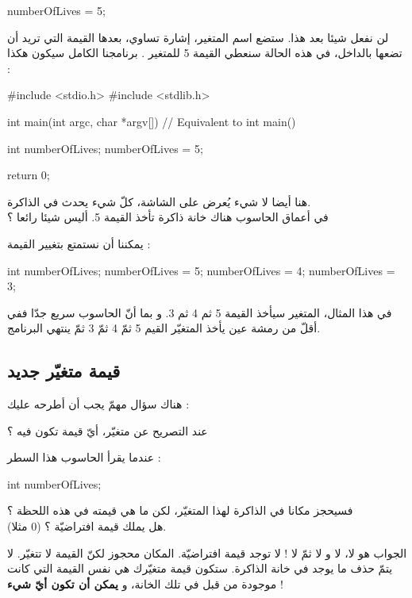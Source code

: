 \begin{Csource}
numberOfLives = 5;
\end{Csource}

لن نفعل شيئا بعد هذا. ستضع اسم المتغير، إشارة تساوي، بعدها القيمة التي تريد أن تضعها بالداخل، في هذه الحالة سنعطي القيمة 5 للمتغير
.
برنامجنا الكامل سيكون هكذا :

\begin{Csource}
#include <stdio.h>
#include <stdlib.h>

int main(int argc, char *argv[]) // Equivalent to int main()
{
  int numberOfLives;
  numberOfLives = 5;

  return 0;
}
\end{Csource}

هنا أيضا لا شيء يُعرض على الشاشة، كلّ شيء يحدث في الذاكرة.\\
في أعماق الحاسوب هناك خانة ذاكرة تأخذ القيمة 5. أليس شيئا رائعا ؟

يمكننا أن نستمتع بتغيير القيمة :

\begin{Csource}
int numberOfLives;
numberOfLives = 5;
numberOfLives = 4;
numberOfLives = 3;
\end{Csource}

في هذا المثال، المتغير سيأخذ القيمة 5 ثم 4 ثم 3. و بما أنّ الحاسوب سريع جدّا ففي أقلّ من رمشة عين يأخذ المتغيّر القيم 5 ثمّ 4 ثمّ 3 ثمّ ينتهي البرنامج.

\subsection{قيمة متغيّر جديد}

هناك سؤال مهمّ يجب أن أطرحه عليك :

\begin{question}
  عند التصريح عن متغيّر، أيّ قيمة تكون فيه ؟
\end{question}

عندما يقرأ الحاسوب هذا السطر :

\begin{Csource}
int numberOfLives;
\end{Csource}

فسيحجز مكانا في الذاكرة لهذا المتغيّر، لكن ما هي قيمته في هذه اللحظة ؟\\
هل يملك قيمة افتراضيّة ؟ (0 مثلا).

الجواب هو لا، لا و لا ثمّ لا ! لا توجد قيمة افتراضيّة. المكان محجوز لكنّ القيمة لا تتغيّر. لا يتمّ حذف ما يوجد في خانة الذاكرة. ستكون قيمة متغيّرك هي نفس القيمة التي كانت موجودة من قبل في تلك الخانة، و
\textbf{يمكن أن تكون أيّ شيء} !

